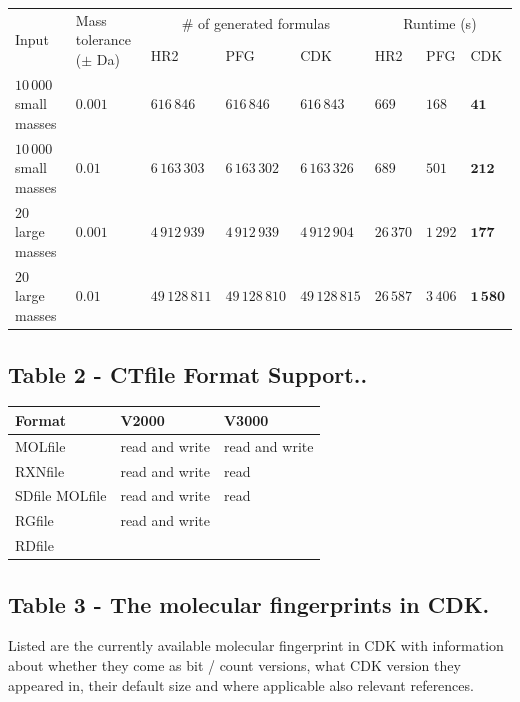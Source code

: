 \documentclass[10pt]{bmcart}
\begin{document}
\begin{backmatter}
    \begin{minipage}{1\textwidth}
    \centering
    \begin{tabular}{llllllll}
	\multirow{2}{*}{ Input } & \multirow{2}{*}{ Mass tolerance ($\pm$ Da) } & \multicolumn{3}{c}{ \# of generated formulas } & \multicolumn{3}{c}{ Runtime (s) } \\
	& & HR2 & PFG & CDK & HR2 & PFG & CDK \\
	$10\,000$ small masses & $0.001$ & $616\,846$ & $616\,846$ & $616\,843$ & $669$ & $168$ & $\mathbf{41}$ \\
	$10\,000$ small masses & $0.01$ & $6\,163\,303$ & $6\,163\,302$ & $6\,163\,326$ & $689$ & $501$ & $\mathbf{212}$ \\
	$20$ large masses & $0.001$ & $4\,912\,939$ & $4\,912\,939$ & $4\,912\,904$ & $26\,370$ & $1\,292$ & $\mathbf{177}$ \\
	$20$ large masses & $0.01$ & $49\,128\,811$ & $49\,128\,810$ & $49\,128\,815$ & $26\,587$ & $3\,406$ & $\mathbf{1\,580}$ \\
    \end{tabular}
    \end{minipage}

      \subsection*{Table 2 - CTfile Format Support..}\label{tab:ctfileFormats}

    \begin{minipage}{1\textwidth}
    \renewcommand*{\thempfootnote}{\fnsymbol{mpfootnote}}
    \centering
    \begin{tabular}{lll}
  \textbf{Format}            & \textbf{V2000}  & \textbf{V3000} \\ \hline
    MOLfile & read and write & read and write \\
    RXNfile & read and write & read \\
    SDfile MOLfile & read and write & read \\ %
    RGfile & read and write & \\
    RDfile & & \\ %
    \end{tabular}
    \end{minipage}


  \subsection*{Table 3 - The molecular fingerprints in CDK.}
  \label{tab:fingerprints}
  Listed are the currently available molecular fingerprint in CDK with
  information about whether they come as bit / count versions, what CDK version
  they appeared in, their default size and where applicable also relevant
  references.
  \baselineskip


\end{backmatter}
\end{document}
